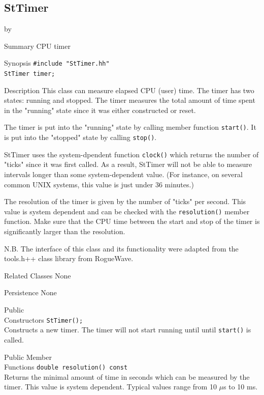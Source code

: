 \documentclass[twoside]{article}
\newcommand{\comp}[1]{\texttt{#1}}%
\newcommand{\entrylabel}[1]{\mbox{\textbf{{#1}}}\hfil}%
\newenvironment{entry}
{\begin{list}{}%
    {\renewcommand{\makelabel}{\entrylabel}%
     \setlength{\labelwidth}{90pt}%
     \setlength{\leftmargin}{\labelwidth}
     \advance\leftmargin by \labelsep%
      }%
    }%
  {\end{list}}
\newcommand{\Entrylabel}[1]%
{\raisebox{0pt}[1ex][0pt]{\makebox[\labelwidth][l]%
    {\parbox[t]{\labelwidth}{\hspace{0pt}\textbf{{#1}}}}}}
\newenvironment{Entry}%
{\renewcommand{\entrylabel}{\Entrylabel}\begin{entry}}%
  {\end{entry}}
\begin{document}
\begin{description}
\subsection{StTimer }
\begin{Entry}
\item[Summary]
    CPU timer
    
\item[Synopsis]
    \verb+#include "StTimer.hh"+ \\
    \verb+StTimer timer;+
    
\item[Description]    
    This class can measure elapsed CPU (user) time. The timer has two
    states: running and stopped. The timer measures the total amount
    of time spent in the "running" state since it was either
    constructed or reset.
    
    The timer is put into the "running" state by calling member
    function \comp{start()}. It is put into the "stopped" state by
    calling \comp{stop()}.
    
    StTimer uses the system-dpendent function \comp{clock()} which
    returns the number of "ticks" since it was first called. As a
    result, StTimer will not be able to measure intervals longer than
    some system-dependent value. (For instance, on several common UNIX
    systems, this value is just under 36 minutes.)
    
    The resolution of the timer is given by the number of "ticks" per
    second.  This value is system dependent and can be checked with
    the \comp{resolution()} member function. Make sure that the CPU time
    between the start and stop of the timer is significantly larger
    than the resolution.

    N.B. The interface of this class and its functionality were adapted
    from the tools.h++ class library from RogueWave.
    
\item[Related Classes]
    None
    
\item[Persistence]
    None
    
\item[Public\\ Constructors]
    \verb+StTimer();+ \\
    Constructs a new timer. The timer will not start
    running until until \comp{start()} is called.

\item[Public Member\\ Functions]
    \verb+double resolution() const+\\
    Returns the minimal amount of time in seconds which can be
    measured by the timer. This value is system dependent.
    Typical values range from 10 $\mu$s to 10 ms.
    

\end{Entry}
\end{description}
\end{document}

